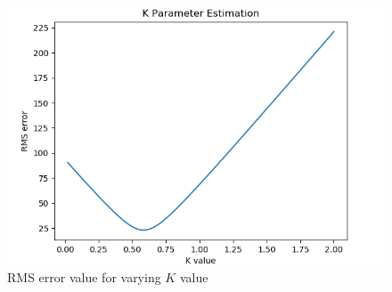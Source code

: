 \begin{figure}[h!]
  \centering
  \captionsetup{justification=centering}
  \includegraphics[width=\textwidth]{./pictures/k-rms-copy}
  \caption{RMS error value for varying $K$ value}
  \label{fig:k-rms}
\end{figure}
